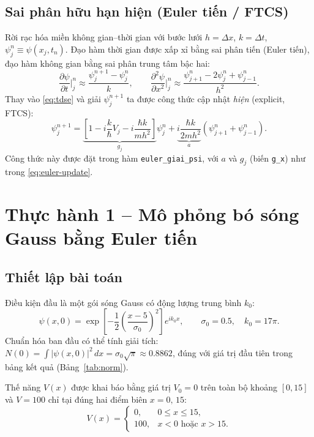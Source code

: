 \documentclass[12pt,a4paper]{article}
\begin{document}
\subsection{Sai phân hữu hạn hiện (Euler tiến / FTCS)}

Rời rạc hóa miền không gian--thời gian với bước lưới $h=\Delta x$, $k=\Delta t$, $\psi^n_j \equiv \psi(x_j,t_n)$. Đạo hàm thời gian được xấp xỉ bằng sai phân tiến (Euler tiến), đạo hàm không gian bằng sai phân trung tâm bậc hai:
\begin{equation}
\frac{\partial \psi}{\partial t}\bigg|_{j}^{n} \approx \frac{\psi^{n+1}_j-\psi^{n}_j}{k}, \qquad
\frac{\partial^2 \psi}{\partial x^2}\bigg|_{j}^{n} \approx \frac{\psi^{n}_{j+1}-2\psi^{n}_j+\psi^{n}_{j-1}}{h^2}.
\end{equation}
Thay vào \eqref{eq:tdse} và giải $\psi^{n+1}_j$ ta được công thức cập nhật \emph{hiện} (explicit, FTCS):
\begin{equation}
\psi^{n+1}_j = \underbrace{\left[1 - i\frac{k}{\hbar}V_j - i\frac{\hbar k}{m h^2}\right]}_{g_j}\psi^{n}_j
+ \underbrace{i\frac{\hbar k}{2mh^2}}_{a}\left(\psi^{n}_{j+1}+\psi^{n}_{j-1}\right).
\label{eq:euler-update}
\end{equation}
Công thức này được đặt trong hàm \texttt{euler\_giai\_psi}, với $a$ và $g_j$ (biến \texttt{g\_x}) như trong \eqref{eq:euler-update}.

\section{Thực hành 1 -- Mô phỏng bó sóng Gauss bằng Euler tiến}

\subsection{Thiết lập bài toán}

Điều kiện đầu là một gói sóng Gauss có động lượng trung bình $k_0$:
\begin{equation}
\psi(x,0) = \exp\!\left[-\frac{1}{2}\left(\frac{x-5}{\sigma_0}\right)^2\right] e^{ik_0 x}, \qquad \sigma_0=0.5,\quad k_0 = 17\pi.
\end{equation}
Chuẩn hóa ban đầu có thể tính giải tích: $N(0)=\int |\psi(x,0)|^2\,dx = \sigma_0\sqrt{\pi} \approx 0.8862$, đúng với giá trị đầu tiên trong bảng kết quả (Bảng~\ref{tab:norm}).

Thế năng $V(x)$ được khai báo bằng giá trị $V_0=0$ trên toàn bộ khoảng $[0,15]$ và $V=100$ chỉ tại đúng hai điểm biên $x=0,\,15$:
\begin{equation}
V(x) =
\begin{cases}
0, & 0 \le x \le 15,\\
100, & x < 0 \text{ hoặc } x > 15.
\end{cases}
\end{equation}
\end{document}
